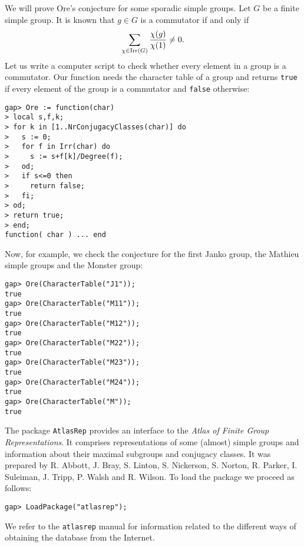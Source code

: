 \begin{example}
\label{exa:Ore}
We will prove Ore's conjecture for some
sporadic simple groups. Let $G$ be a finite simple group.
It is known that $g\in G$ is a commutator if and only if
\[
\sum_{\chi\in\operatorname{Irr}(G)}\frac{\chi(g)}{\chi(1)}\ne 0.
\]
Let us write
a computer script to check whether every element in a group
is a commutator. Our
function needs the character table of a group and returns
\lstinline{true} if every element of the group is a commutator and \lstinline{false} otherwise:
\begin{lstlisting}
gap> Ore := function(char)
> local s,f,k;
> for k in [1..NrConjugacyClasses(char)] do
>   s := 0;
>   for f in Irr(char) do
>     s := s+f[k]/Degree(f);
>   od;
>   if s<=0 then
>     return false;
>   fi;
> od;
> return true;
> end;
function( char ) ... end
\end{lstlisting}

Now, for example,   
we check the conjecture for the first Janko group, the 
Mathieu simple groups and 
the Monster group:
\begin{lstlisting}
gap> Ore(CharacterTable("J1"));
true
gap> Ore(CharacterTable("M11"));
true
gap> Ore(CharacterTable("M12"));
true
gap> Ore(CharacterTable("M22"));
true
gap> Ore(CharacterTable("M23"));
true
gap> Ore(CharacterTable("M24"));
true
gap> Ore(CharacterTable("M"));
true
\end{lstlisting}
\end{example}

The package \lstinline{AtlasRep} provides
an interface to the \emph{Atlas of Finite Group Representations}. 
It comprises representations 
of some (almost) simple groups and 
information about their maximal subgroups and conjugacy classes. 
It was prepared by 
R. Abbott, J. Bray, S. Linton, S. Nickerson, 
S. Norton, R. Parker, I. Suleiman, J. Tripp, P. Walsh and
R. Wilson.  To load the package we proceed as follows:
\begin{lstlisting}
gap> LoadPackage("atlasrep");
\end{lstlisting}
We refer to the \lstinline{atlasrep} manual 
for information related to the different ways of 
obtaining the database from the Internet. 

